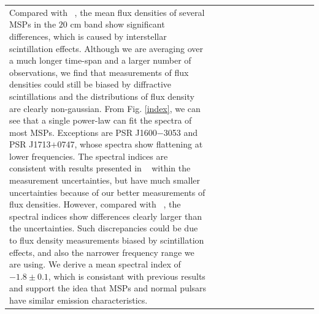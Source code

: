 \documentclass[useAMS,usenatbib]{mn2e}
\begin{document}
\begin{table}
\begin{center}
\begin{tabular}{lcccccccccccc}
Compared with ~\citet{Yan11}, the mean flux densities of several MSPs in the $20$ cm 
band show significant differences, which is caused by interstellar scintillation effects.
%
Although we are averaging over a much longer time-span and a larger number of observations, 
we find that measurements of flux densities could still be biased by diffractive 
scintillations and the distributions of flux density are clearly non-gaussian.
%
From Fig. \ref{index}, we can see that a single power-law can fit the spectra 
of most MSPs. Exceptions are PSR J1600$-$3053 and PSR J1713$+$0747, whose spectra show 
flattening at lower frequencies.
%
The spectral indices are consistent with results presented in ~\citet{Toscano98} within 
the measurement uncertainties, but have much smaller uncertainties because of our 
better measurements of flux densities. 
%
However, compared with ~\citet{Kramer99}, the spectral indices show differences 
clearly larger than the uncertainties.
%
Such discrepancies could be due to flux density measurements biased by scintillation 
effects, and also the narrower frequency range we are using.
%
We derive a mean spectral index of $-1.8\pm0.1$, which is consistant with previous 
results and support the idea that MSPs and normal pulsars have similar emission 
characteristics.
%



\end{tabular}
\end{center}
\end{table}
\end{document}
